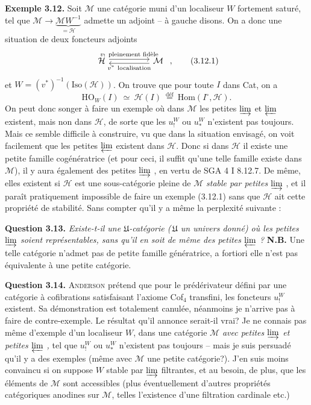 \documentclass[11pt]{article}
\newcommand{\printedpage}[1]{\marginpar{\footnotesize p.~#1}}
\newcommand{\msp}[1]{\marginpar{\footnotesize [#1]}}
\newcommand{\limind}{\varinjlim}
\newcommand{\limproj}{\varprojlim}
\begin{document}
\textbf{Exemple 3.12.} Soit $\mathcal{M}$ une catégorie muni d'un localiseur $W$ fortement saturé, tel que $\mathcal{M} \longrightarrow \underbrace{\mathcal{M}W^{-1}}_{=\mathcal{H}}$ admette un adjoint -- à gauche disons. On a donc une situation de deux foncteurs adjoints %
\[
\begin{tikzcd}[column sep=huge]
\mathcal{H} \arrow[r, shift left, "v_!\ \text{pleinement fidèle}"] & \mathcal{M} \arrow[l, shift left, "v^*\ \text{localisation}"]
\end{tikzcd}
\ , \tag*{(3.12.1)}
\]
et $W=(v^*)^{-1}(\mathrm{Iso}(\mathcal{H}))$. On trouve que pour toute $I$ dans Cat, on a
\[
\mathrm{HO}_W(I) \ \simeq \ \mathcal{H}(I) \ \overset{\text{déf}}{=} \ \mathrm{Hom}(I^\circ,\mathcal{H}). \tag*{(3.12.2)} %
\]
On peut donc songer à faire un exemple où dans $\mathcal{M}$ les petites $\limind$ et $\limproj$ existent, mais non dans $\mathcal{H}$, de sorte que les $u_!^W$ ou $u_*^W$ n'existent pas toujours. Mais ce semble difficile à construire, vu que dans la situation envisagé, on voit facilement que les petites $\limproj$ existent dans $\mathcal{H}$. Donc si dans $\mathcal{H}$ %
\msp{page 47}
il existe une petite famille cogénératrice (et pour ceci, il suffit qu'une telle famille existe dans $\mathcal{M}$), il y aura également des petites $\limind$ , en vertu de SGA 4 I 8.12.7. De même, elles existent si $\mathcal{H}$ est une sous-catégorie pleine de $\mathcal{M}$ \textit{stable par petites} $\limind$ , et il paraît pratiquement impossible de faire un exemple (3.12.1) sans que $\mathcal{H}$ ait cette propriété de stabilité. Sans compter qu'il y a même la perplexité suivante :

\marginpar{! \textbar}\textbf{Question 3.13.} \textit{Existe-t-il une $\mathfrak{U}$-catégorie (\,$\mathfrak{U}$ un univers donné) où les petites $\limind$ soient représentables, sans qu'il en soit de même des petites $\limproj$ ?} \textbf{N.B.} Une telle catégorie n'admet pas de petite famille génératrice, a fortiori elle n'est pas équivalente à une petite catégorie.

\msp{page 48}
\textbf{Question 3.14.} \textsc{Anderson} prétend que pour le prédérivateur défini par une catégorie à cofibrations satisfaisant l'axiome Cof$_4$ transfini, les foncteurs $u_!^W$ existent. Sa démonstration est totalement canulée, néanmoins je n'arrive pas à faire de contre-exemple. Le résultat qu'il annonce serait-il vrai? Je ne connais pas même d'exemple d'un localiseur $W$, dans une catégorie $\mathcal{M}$ \textit{avec petites $\limind$ et petites $\limproj$ ,} tel que $u_!^W$ ou $u_*^W$ n'existent pas toujours -- mais je suis persuadé qu'il y a des exemples (même avec $\mathcal{M}$ une petite catégorie?). J'en suis moins convaincu si on suppose $W$ stable par $\limind$ filtrantes, et au besoin, de plus, que les éléments de $\mathcal{M}$ sont accessibles (plus éventuellement d'autres propriétés catégoriques anodines sur $\mathcal{M}$, telles l'existence d'une filtration
\printedpage{26}
\msp{page 49}
cardinale etc.)
\end{document}
